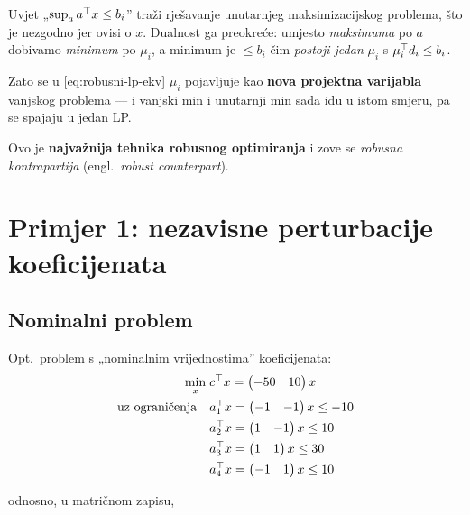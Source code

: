 \begin{napomena}
Uvjet „$\sup_{a} a\T x \le b_i$” traži rješavanje unutarnjeg maksimizacijskog
problema, što je nezgodno jer ovisi o $x$. Dualnost ga preokreće: umjesto
\emph{maksimuma} po $a$ dobivamo \emph{minimum} po $\mu_i$, a minimum je
$\le b_i$ čim \emph{postoji jedan} $\mu_i$ s $\mu_i\T d_i \le b_i$.

Zato se u \eqref{eq:robusni-lp-ekv} $\mu_i$ pojavljuje kao \textbf{nova
projektna varijabla} vanjskog problema --- i vanjski min i unutarnji min sada
idu u istom smjeru, pa se spajaju u jedan LP.

Ovo je \textbf{najvažnija tehnika robusnog optimiranja} i zove se
\emph{robusna kontrapartija} (engl.\ \emph{robust counterpart}).
\end{napomena}

\section{Primjer 1: nezavisne perturbacije koeficijenata}
\label{sec:robusno-primjer1}

\subsection{Nominalni problem}

Opt.\ problem s „nominalnim vrijednostima” koeficijenata:
\[
\begin{aligned}
\min_x \; & c\T x = \begin{pmatrix}-50 & 10\end{pmatrix}x \\
\uzogr & a_1\T x = \begin{pmatrix}-1 & -1\end{pmatrix}x \le -10 \\
& a_2\T x = \begin{pmatrix}1 & -1\end{pmatrix}x \le 10 \\
& a_3\T x = \begin{pmatrix}1 & 1\end{pmatrix}x \le 30 \\
& a_4\T x = \begin{pmatrix}-1 & 1\end{pmatrix}x \le 10
\end{aligned}
\]

odnosno, u matričnom zapisu,

